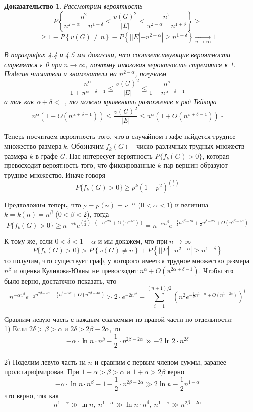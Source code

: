 \documentclass[a4paper]{article}
\newtheorem*{msolution}{Доказательство}
\begin{document}
\begin{msolution}
   Рассмотрим вероятность 
   $$P\left\{\frac{n^2}{n^{2-\alpha} + n^{1+\delta}} \leq \frac{v(G)^2}{|E|} \leq \frac{n^2}{n^{2-\alpha} - n^{1+\delta}} \right\}
    \geq $$ $$ \geq 1 - P\left\{v(G) \neq n\right\} - P\left\{||E| - n^{2-\alpha}| \geq
n^{1+\delta}\right\} \xrightarrow[n \to \infty]{} 1$$

В параграфах 4.4 и 4.5 мы доказали, что соответствующие вероятности стремятся к 0 при $n \to \infty$, 
поэтому итоговая вероятность стремится к 1. Поделив числители и знаменатели на $n^{2-\alpha}$, получаем 
$$\frac{n^{\alpha}}{1 + n^{\alpha + \delta - 1}} \leq \frac{v(G)^2}{|E|} \leq \frac{n^{\alpha}}{1 - n^{\alpha + \delta - 1}}$$
а так как $\alpha + \delta < 1$, то можно применить разложение в ряд Тейлора
$$n^{\alpha}\left(1 - O(n^{\alpha + \delta - 1})\right) \leq \frac{v(G)^2}{|E|} \leq n^{\alpha}\left(1 + O(n^{\alpha + \delta - 1})\right)\ \square$$
\end{msolution}

Теперь посчитаем вероятность того, что в случайном графе найдется трудное множество размера $k$. 
Обозначим $f_k(G)$ - число различных трудных множеств размера $k$ в графе $G$. Нас интересует 
вероятность $P\{f_k(G) > 0\}$, которая превосходит вероятность того, что фиксированные $k$ пар 
вершин образуют трудное множество. Иначе говоря $$P\{f_k(G) > 0\} \geq p^k\left(1-p^2\right)^{\binom{k}{2}}$$

Предположим теперь, что $p = p(n) = n^{-\alpha}$ ($0 < \alpha < 1$) и величина $k = k(n) = n^{\beta}$ ($0 < \beta < 2$), тогда $$P\{f_k(G) > 0\} \geq 
n^{-\alpha k}e^{\binom{k}{2}\cdot(-n^{-2\alpha} + O(n^{-4\alpha}))} = n^{-\alpha n^{\beta}} 
e^{-\frac{1}{2}n^{2\beta-2\alpha} + \frac{1}{2}n^{\beta - 2\alpha} + O(n^{2\beta - 4\alpha})}$$

К тому же, если $0 < \delta < 1 - \alpha$ и мы докажем, что при $n \rightarrow \infty$ $$P\{f_k(G) > 0\} > P\left\{v(G) \neq n\right\} + P\left\{||E| - n^{2-\alpha}| \geq
n^{1+\delta}\right\}$$ то получим, что существует граф, у которого имеется трудное множество 
размера $n^\beta$ и оценка Куликова-Юкны не превосходит $n^{\alpha} + O(n^{2\alpha + \delta-1})$. Чтобы это было верно, достаточно показать, что 
$$n^{-\alpha n^{\beta}} e^{-\frac{1}{2}n^{2\beta-2\alpha} + \frac{1}{2}n^{\beta - 2\alpha} + O(n^{2\beta - 4\alpha})} > 
2\cdot e^{-2n^{2\delta}} + \sum\limits_{i=1}^{(n+1)/2}\left(n^2e^{-\frac{1}{2}n^{1-\alpha} + O(n^{1-2\alpha})}\right)^i$$

Сравним левую часть с каждым слагаемым из правой части по отдельности:\ \\
1) Если $2\delta > \beta > \alpha$ и $2\delta > 2\beta - 2\alpha$, то $$-\alpha\cdot \ln{n}\cdot n^{\beta} - 
\frac{1}{2}\cdot n^{2\beta - 2\alpha} \gg -2\ln{2}\cdot n^{2\delta}$$\ \\
2) Поделим левую часть на $n$ и сравним с первым членом суммы, заранее прологарифмировав. При 
$1-\alpha > \beta > \alpha$ и $1+\alpha > 2\beta$ верно $$-\alpha\cdot \ln{n}\cdot n^{\beta} - 1 -
\frac{1}{2}\cdot n^{2\beta - 2\alpha} \gg 2\ln{n} - \frac{1}{2}n^{1-\alpha}$$ что верно, так как 
$$n^{1-\alpha} \gg \ln{n},\ n^{1-\alpha} \gg \ln{n}\cdot n^{\beta},\ n^{1-\alpha} \gg n^{2\beta - 2\alpha}$$
\end{document}
